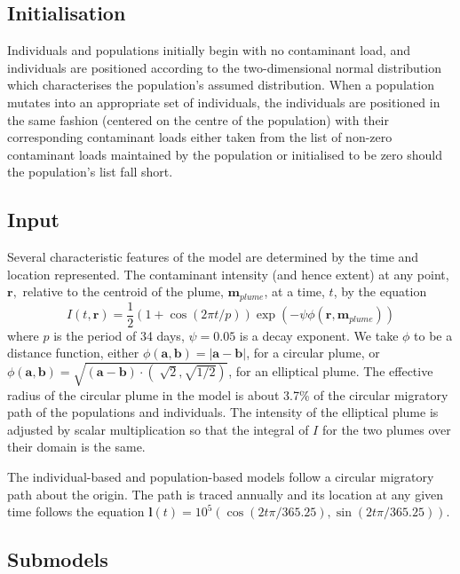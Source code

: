 \subsection{Initialisation}

Individuals and populations initially begin with no contaminant load, and
individuals are positioned according to the two-dimensional normal
distribution which characterises the population's assumed distribution. When a
population mutates into an appropriate set of individuals, the individuals are
positioned in the same fashion (centered on the centre of the population) with
their corresponding contaminant loads either taken from the list of non-zero
contaminant loads maintained by the population or initialised to be zero
should the population's list fall short.

\subsection{Input\label{Circle-and-plume}}

Several characteristic features of the model are determined by the time and
location represented. The contaminant intensity (and hence extent) at any
point, $\mathbf{r},$ relative to the centroid of the plume,
$\mathbf{m}_{{plume}}$, at a time, $t$, by the equation
\[ I (t, \mathbf{r}) = \frac{1}{2} (1 + \cos (2 \pi t / p)) \exp (- \psi \phi ( \mathbf{r}, \mathbf{m}_{{plume}})) \]
where $p$ is the period of 34 days, $\psi = 0.05$ is a decay exponent. We take
$\phi$ to be a distance function, either $\phi ( \mathbf{a}, \mathbf{b}) = | \mathbf{a} - \mathbf{b} |$, for a circular plume, or
$\phi ( \mathbf{a}, \mathbf{b}) = \sqrt{ ( \mathbf{a} - \mathbf{b}) \cdot ( \sqrt[]{2}, \sqrt{1 / 2})}^{}$, for an elliptical plume. The effective radius of
the circular plume in the model is about 3.7\% of the circular migratory path
of the populations and individuals. The intensity of the elliptical plume is
adjusted by scalar multiplication so that the integral of $I$ for the two
plumes over their domain is the same.

The individual-based and population-based models follow a circular migratory
path about the origin. The path is traced annually and its location at any
given time follows the equation $\mathbf{l} \left( t \right) = 10^5 \left( \cos \left( 2 t \pi / 365.25 \right), \sin \left( 2 t \pi / 365.25\right) \right)$.

\subsection{Submodels}

